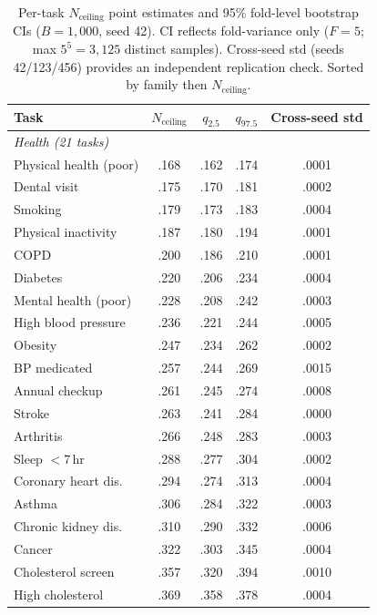 \documentclass{article}
\begin{document}
\begin{table}[htbp]
\centering
\small
\caption{Per-task $N_{\text{ceiling}}$ point estimates and 95\% fold-level bootstrap CIs ($B{=}1{,}000$, seed 42). CI reflects fold-variance only ($F{=}5$; max $5^5{=}3{,}125$ distinct samples). Cross-seed std (seeds 42/123/456) provides an independent replication check. Sorted by family then $N_{\text{ceiling}}$.}
\label{tab:nceiling_boot}
\begin{tabular}{l|c|cc|c}
\toprule
\textbf{Task} & $N_{\text{ceiling}}$ & $q_{2.5}$ & $q_{97.5}$ & \textbf{Cross-seed std} \\
\midrule
\multicolumn{5}{l}{\emph{Health (21 tasks)}} \\
Physical health (poor) & .168 & .162 & .174 & .0001 \\
Dental visit           & .175 & .170 & .181 & .0002 \\
Smoking                & .179 & .173 & .183 & .0004 \\
Physical inactivity    & .187 & .180 & .194 & .0001 \\
COPD                   & .200 & .186 & .210 & .0001 \\
Diabetes               & .220 & .206 & .234 & .0004 \\
Mental health (poor)   & .228 & .208 & .242 & .0003 \\
High blood pressure    & .236 & .221 & .244 & .0005 \\
Obesity                & .247 & .234 & .262 & .0002 \\
BP medicated           & .257 & .244 & .269 & .0015 \\
Annual checkup         & .261 & .245 & .274 & .0008 \\
Stroke                 & .263 & .241 & .284 & .0000 \\
Arthritis              & .266 & .248 & .283 & .0003 \\
Sleep $<$7\,hr         & .288 & .277 & .304 & .0002 \\
Coronary heart dis.    & .294 & .274 & .313 & .0004 \\
Asthma                 & .306 & .284 & .322 & .0003 \\
Chronic kidney dis.    & .310 & .290 & .332 & .0006 \\
Cancer                 & .322 & .303 & .345 & .0004 \\
Cholesterol screen     & .357 & .320 & .394 & .0010 \\
High cholesterol       & .369 & .358 & .378 & .0004 \\

\end{tabular}
\end{table}
\end{document}
